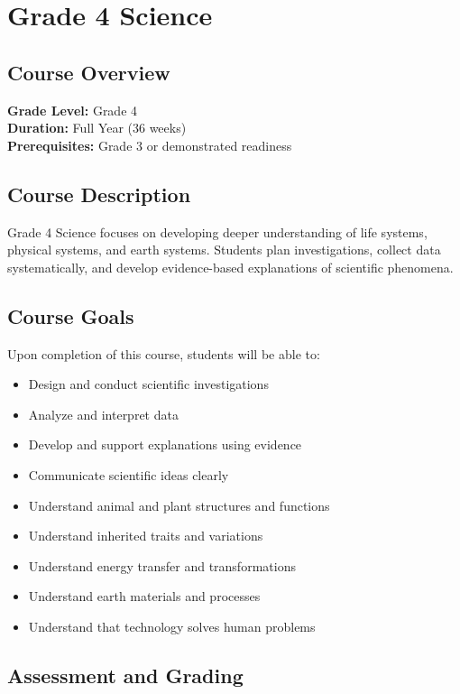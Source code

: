 \documentclass[11pt,letterpaper]{report}
\begin{document}
\chapter{Grade 4 Science}

\section{Course Overview}

\textbf{Grade Level:} Grade 4\\
\textbf{Duration:} Full Year (36 weeks)\\
\textbf{Prerequisites:} Grade 3 or demonstrated readiness

\section{Course Description}

Grade 4 Science focuses on developing deeper understanding of life systems, physical systems, and earth systems. Students plan investigations, collect data systematically, and develop evidence-based explanations of scientific phenomena.

\section{Course Goals}

Upon completion of this course, students will be able to:

\begin{itemize}
    \item Design and conduct scientific investigations
    \item Analyze and interpret data
    \item Develop and support explanations using evidence
    \item Communicate scientific ideas clearly
    \item Understand animal and plant structures and functions
    \item Understand inherited traits and variations
    \item Understand energy transfer and transformations
    \item Understand earth materials and processes
    \item Understand that technology solves human problems
\end{itemize}

\section{Assessment and Grading}
\end{document}
